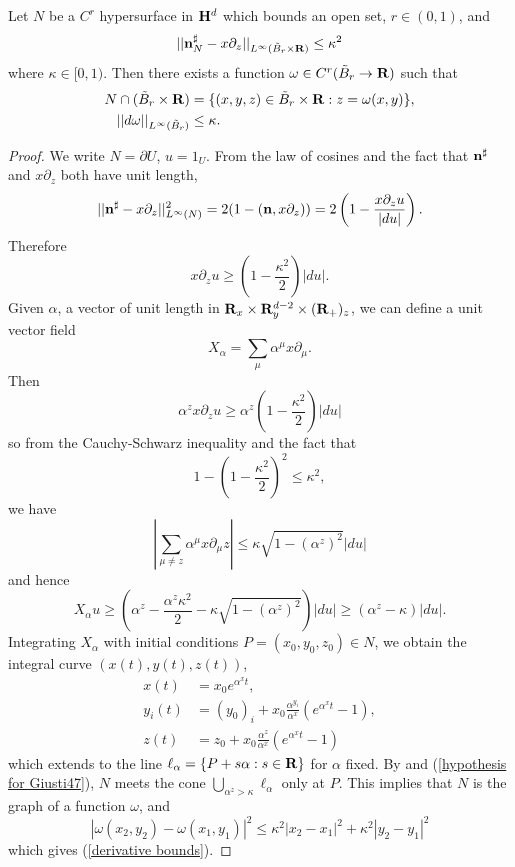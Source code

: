 \begin{lemma}\label{hopfKilling}
Let $N$ be a $C^r$ hypersurface in $\mathbf H^d$ which bounds an open set, $r \in (0, 1)$, and
\begin{equation}\label{kappa-correct alignment}
||\mathbf n_N^\sharp - x\partial_z||_{L^\infty(\tilde B_r \times \mathbf{R})} \leq \kappa^2
\end{equation}
where $\kappa \in [0, 1)$.
Then there exists a function $\omega \in C^r(\tilde B_r \to \mathbf{R})$
such that
\begin{align}
    N \cap (\tilde B_r \times \mathbf{R}) &= \{(x, y, z) \in \tilde B_r\times \mathbf{R}: z = \omega(x, y)\}, \label{N is a graph}\\
    ||d\omega||_{L^\infty(\tilde B_r)} &\leq \kappa. \label{derivative bounds}
\end{align}
\end{lemma}
\begin{proof}
We write $N = \partial U$, $u = 1_U$.
From the law of cosines and the fact that $\mathbf n^\sharp$ and $x\partial_z$ both have unit length,
$$||\mathbf n^\sharp - x\partial_z||_{L^\infty(N)}^2 = 2(1 - (\mathbf n, x\partial_z)) = 2\left(1 - \frac{x\partial_z u}{|du|}\right).$$
Therefore
$$x\partial_z u \geq \left(1 - \frac{\kappa^2}{2}\right) |du|.$$
Given $\alpha$, a vector of unit length in $\mathbf{R}_x \times \mathbf{R}^{d - 2}_y \times (\mathbf{R}_+)_z$, we can define a unit vector field
$$X_\alpha = \sum_\mu \alpha^\mu x\partial_\mu.$$
Then
$$\alpha^z x\partial_z u \geq \alpha^z \left(1 - \frac{\kappa^2}{2}\right) |du|$$
so from the Cauchy-Schwarz inequality and the fact that
$$1 - \left(1 - \frac{\kappa^2}{2}\right)^2 \leq \kappa^2,$$
we have
$$\left|\sum_{\mu \neq z} \alpha^\mu x\partial_\mu z\right| \leq \kappa\sqrt{1 - (\alpha^z)^2} |du|$$
and hence
\begin{equation}\label{hypothesis for Giusti47}
X_\alpha u \geq \left(\alpha^z - \frac{\alpha^z \kappa^2}{2} - \kappa\sqrt{1 - (\alpha^z)^2}\right)|du| \geq (\alpha^z - \kappa)|du|.
\end{equation}
Integrating $X_\alpha$ with initial conditions $P = (x_0, y_0, z_0) \in N$, we obtain the integral curve $(x(t), y(t), z(t))$,
\begin{align*}
x(t) &= x_0 e^{\alpha^x t}, \\
y_i(t) &= (y_0)_i + x_0 \frac{\alpha^{y_i}}{\alpha^x}(e^{\alpha^x t} - 1),\\
z(t) &= z_0 + x_0 \frac{\alpha^z}{\alpha^x}(e^{\alpha^x t} - 1)
\end{align*}
which extends to the line $\ell_\alpha = \{P + s\alpha: s \in \mathbf{R}\}$ for $\alpha$ fixed. 
By \cite[Remark 4.7]{Giusti77} and (\ref{hypothesis for Giusti47}), $N$ meets the cone $\bigcup_{\alpha^z > \kappa} \ell_\alpha$
only at $P$. This implies that $N$ is the graph of a function $\omega$, and 
$$|\omega(x_2, y_2) - \omega(x_1, y_1)|^2 \leq \kappa^2 |x_2 - x_1|^2 + \kappa^2 |y_2 - y_1|^2$$
which gives (\ref{derivative bounds}).
\end{proof}

